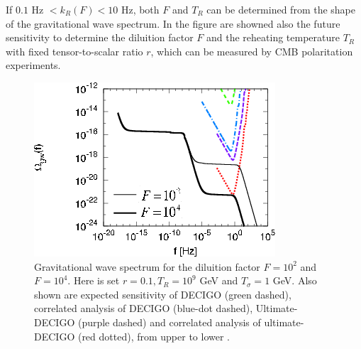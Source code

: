 \documentclass[11pt,a4paper,twoside]{book}
\begin{document}
If $ 0.1$ Hz $ < k_{R}(F) <10$ Hz, both $ F $ and $ T_{R} $ can be determined from the shape of the gravitational wave spectrum. In the figure are showned also the future sensitivity to determine the diluition factor $ F $ and the reheating temperature $ T_{R} $ with fixed tensor-to-scalar ratio $ r $, which can be measured by CMB polaritation experiments.
\begin{figure}
	\centering
	\includegraphics[width=0.7\linewidth, height=0.3\textheight]{Images/Chap3/Nakayama_Saito_Fig6}
	\caption{Gravitational wave spectrum for the diluition factor $ F=10^{2} $ and $ F=10^{4} $. Here is set $ r=0.1, T_{R}=10^{9} $ GeV and $ T_{\sigma}=1 $ GeV. Also shown are expected sensitivity of DECIGO (green dashed), correlated analysis of DECIGO (blue-dot dashed), Ultimate-DECIGO (purple dashed) and correlated analysis of ultimate-DECIGO (red dotted), from upper to lower \cite{Chap3:ProibingReheatingTemperature2008}.}
	\label{fig:nakayamasaitofig6}
\end{figure}
\end{document}
